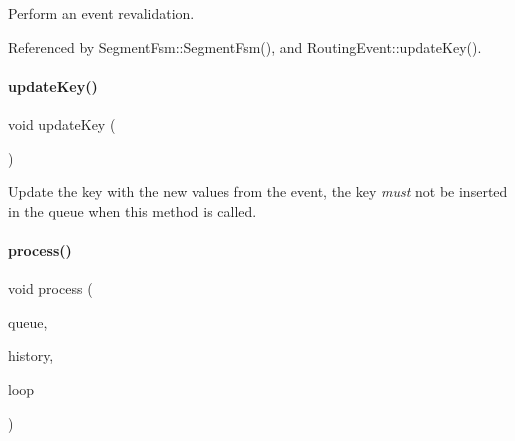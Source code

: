 Perform an event revalidation. 

Referenced by Segment\+Fsm\+::\+Segment\+Fsm(), and Routing\+Event\+::update\+Key().

\mbox{\label{classKite_1_1RoutingEvent_a14468bece068cbc5221f057226ee8955}} 
\paragraph{\texorpdfstring{update\+Key()}{updateKey()}}
{\footnotesize\ttfamily void update\+Key (\begin{DoxyParamCaption}{ }\end{DoxyParamCaption})\hspace{0.3cm}{\ttfamily [inline]}}

Update the key with the new values from the event, the key {\itshape must} not be inserted in the queue when this method is called. \mbox{\label{classKite_1_1RoutingEvent_a6add4f520081c698421481bf8fe0ad1f}} 
\paragraph{\texorpdfstring{process()}{process()}}
{\footnotesize\ttfamily void process (\begin{DoxyParamCaption}\item[{\mbox{\hyperlink{classKite_1_1RoutingEventQueue}{Routing\+Event\+Queue}} \&}]{queue,  }\item[{\mbox{\hyperlink{classKite_1_1RoutingEventHistory}{Routing\+Event\+History}} \&}]{history,  }\item[{\mbox{\hyperlink{classKite_1_1RoutingEventLoop}{Routing\+Event\+Loop}} \&}]{loop }\end{DoxyParamCaption})}


